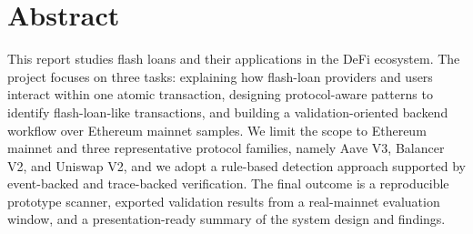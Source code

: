 \section{Abstract}

This report studies flash loans and their applications in the DeFi ecosystem. The project focuses on three tasks: explaining how flash-loan providers and users interact within one atomic transaction, designing protocol-aware patterns to identify flash-loan-like transactions, and building a validation-oriented backend workflow over Ethereum mainnet samples. We limit the scope to Ethereum mainnet and three representative protocol families, namely Aave V3, Balancer V2, and Uniswap V2, and we adopt a rule-based detection approach supported by event-backed and trace-backed verification. The final outcome is a reproducible prototype scanner, exported validation results from a real-mainnet evaluation window, and a presentation-ready summary of the system design and findings.
